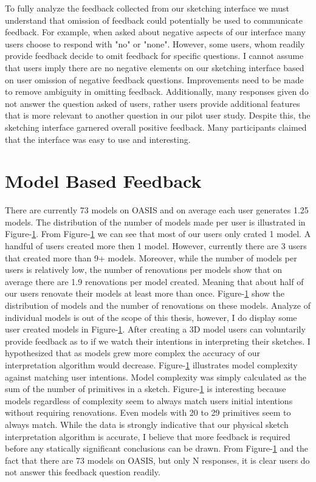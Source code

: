 To fully analyze the feedback collected from our sketching interface we must understand that omission of feedback could potentially be used to communicate feedback.
For example, when asked about negative aspects of our interface many users choose to respond with "no" or "none".
However, some users, whom readily provide feedback decide to omit feedback for specific questions.
I cannot assume that users imply there are no negative elements on our sketching interface based on user omission of negative feedback questions.
Improvements need to be made to remove ambiguity in omitting feedback.
Additionally, many responses given do not answer the question asked of users, rather users provide additional features that is more relevant to another question in our pilot user study.
Despite this, the sketching interface garnered overall positive feedback. 
Many participants claimed that the interface was easy to use and interesting.



\section{Model Based Feedback}

There are currently 73 models on OASIS and on average each user generates 1.25 models.
The distribution of the number of models made per user is illustrated in Figure-\ref{}.
From Figure-\ref{} we can see that most of our users only crated 1 model. A handful of users created more then 1 model.
However, currently there are 3 users that created more than 9+ models.
Moreover, while the number of models per users is relatively low, the number of renovations per models show that on average there are 1.9 renovations per model created.
Meaning that about half of our users renovate their models at least more than once.
Figure-\ref{} show the distribution of models and the number of renovations on these models.
Analyze of individual models is out of the scope of this thesis, however, I do display some user created models in Figure-\ref{}.
After creating a 3D model users can voluntarily provide feedback as to if we watch their intentions in interpreting their sketches.
I hypothesized that as models grew more complex the accuracy of our interpretation algorithm would decrease.
Figure-\ref{} illustrates model complexity against matching user intentions.
Model complexity was simply calculated as the sum of the number of primitives in a sketch.
Figure-\ref{} is interesting because models regardless of complexity seem to always match users initial intentions without requiring renovations.
Even models with 20 to 29 primitives seem to always match.
While the data is strongly indicative that our physical sketch interpretation algorithm is accurate, I believe that more feedback is required before any statically significant conclusions can be drawn.
From Figure-\ref{} and the fact that there are 73 models on OASIS, but only N responses, it is clear users do not answer this feedback question readily.


